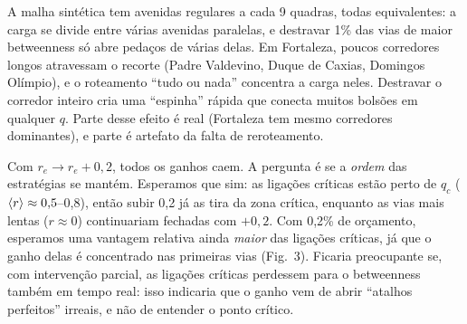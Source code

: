 \documentclass[11pt]{article}
\begin{document}
A malha sintética tem avenidas regulares a cada 9 quadras, todas equivalentes: a carga se divide entre várias avenidas paralelas, e destravar 1\% das vias de maior betweenness só abre pedaços de várias delas. Em Fortaleza, poucos corredores longos atravessam o recorte (Padre Valdevino, Duque de Caxias, Domingos Olímpio), e o roteamento ``tudo ou nada'' concentra a carga neles. Destravar o corredor inteiro cria uma ``espinha'' rápida que conecta muitos bolsões em qualquer $q$. Parte desse efeito é real (Fortaleza tem mesmo corredores dominantes), e parte é artefato da falta de reroteamento.

Com $r_e\to r_e+0{,}2$, todos os ganhos caem. A pergunta é se a \emph{ordem} das estratégias se mantém. Esperamos que sim: as ligações críticas estão perto de $q_c$ ($\left\langle r \right\rangle\approx0{,}5$--0,8), então subir 0,2 já as tira da zona crítica, enquanto as vias mais lentas ($r\approx0$) continuariam fechadas com $+0{,}2$. Com 0,2\% de orçamento, esperamos uma vantagem relativa ainda \emph{maior} das ligações críticas, já que o ganho delas é concentrado nas primeiras vias (Fig.\ 3). Ficaria preocupante se, com intervenção parcial, as ligações críticas perdessem para o betweenness também em tempo real: isso indicaria que o ganho vem de abrir ``atalhos perfeitos'' irreais, e não de entender o ponto crítico.
\end{document}
